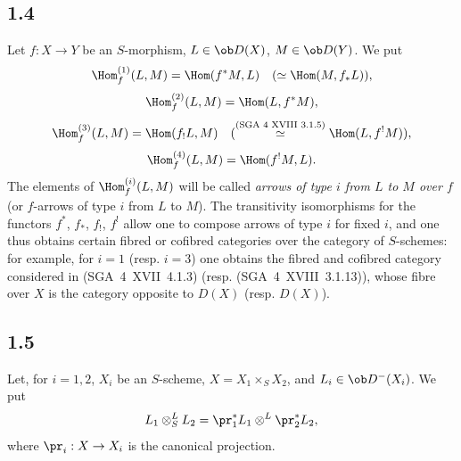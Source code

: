 \subsection*{1.4}
Let $f:X\to Y$ be an $S$-morphism, $L\in\ob D(X)$, $M\in\ob D(Y)$. We put
\[
\Hom_f^{(1)}(L,M)=\Hom(f^{*}M,L)\quad (\simeq \Hom(M,f_{*}L)),
\]
\[
\Hom_f^{(2)}(L,M)=\Hom(L,f^{*}M),
\]
\[
\Hom_f^{(3)}(L,M)=\Hom(f_{!}L,M)\quad (\overset{\text{(SGA~4~XVIII~3.1.5)}}{\simeq} \Hom(L,f^{!}M)),
\]
\[
\Hom_f^{(4)}(L,M)=\Hom(f^{!}M,L).
\]
The elements of $\Hom_f^{(i)}(L,M)$ will be called \emph{arrows of type $i$ from $L$ to $M$ over $f$} (or $f$-arrows of type $i$ from $L$ to $M$). The transitivity isomorphisms for the functors $f^{*}$, $f_{*}$, $f_{!}$, $f^{!}$ allow one to compose arrows of type $i$ for fixed $i$, and one thus obtains certain fibred or cofibred categories over the category of $S$-schemes: for example, for $i=1$ (resp. $i=3$) one obtains the fibred and cofibred category considered in (SGA~4~XVII~4.1.3) (resp. (SGA~4~XVIII~3.1.13)), whose fibre over $X$ is the category opposite to $D(X)$ (resp. $D(X)$).

\subsection*{1.5}
Let, for $i=1,2$, $X_i$ be an $S$-scheme, $X=X_1\times_SX_2$, and $L_i\in\ob D^{-}(X_i)$. We put
\[
L_1\otimes^L_SL_2=\pr_1^{*}L_1\otimes^L\pr_2^{*}L_2,
\]
where $\pr_i:X\to X_i$ is the canonical projection.

